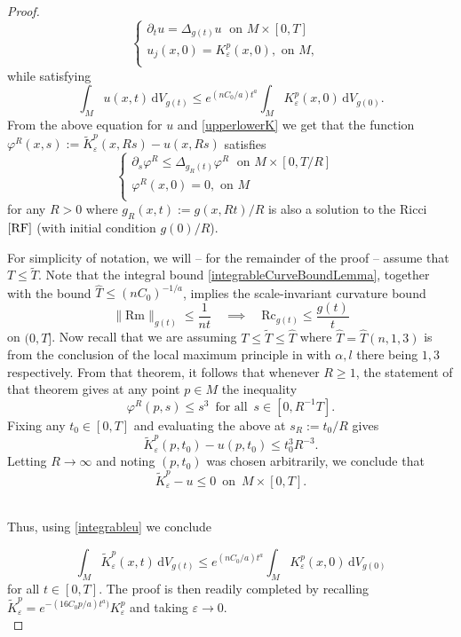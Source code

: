 \documentclass{amsart}
\theoremstyle{definition}
\newcommand{\Rm}{\mathrm{Rm}}
\newcommand{\Rc}{\mathrm{Rc}}
\newcommand{\dV}{\mathrm{d}V}
\let\epsilon\varepsilon
\begin{document}
\begin{proof}
\[
\begin{cases}
\partial_t u= \Delta_{g(t)} u\; \text{ on }M\times[0, T] & \\
u_{j}(x,0) = K_{\varepsilon}^p(x,0), \text{ on }M,& \\
\end{cases}
\]
while satisfying
\begin{equation}\label{integrableu}
\int_{M} u(x, t) \,\dV_{g(t)} \le e^{(nC_0/a)t^{a}}\int_{M} K_{\varepsilon}^p(x,0)  \,\dV_{g(0)} .
\end{equation}
From the above equation for $u$ and \eqref{upperlowerK} we get that the function $\varphi^R(x,s):=\widetilde K_{\varepsilon}^p(x,Rs)-u(x,Rs)$ satisfies
\begin{equation}\label{heatphiR}
\begin{cases}
\partial_s \varphi^R\leq \Delta_{g_R(t)} \varphi^R \; \text{ on }M\times[0, T/R] & \\
\varphi^R(x, 0)=0, \text{ on }M& \\
\end{cases}
\end{equation}
for any $R>0$ where $g_R(x, t):=g(x, Rt)/R$ is also a solution to the Ricci $\eqref{RF}$ (with initial condition $g(0)/R$).
\,

For simplicity of notation, we will – for the remainder of the proof – assume that $T\leq \widetilde T$. Note that the integral bound \eqref{integrableCurveBoundLemma}, together with the bound $\widehat T\leq (nC_0)^{-1/a}$, implies the scale-invariant curvature bound
\[
\|\Rm\|_{g(t)}\leq \frac{1}{nt} \quad \implies \quad \Rc_{g(t)}\leq \frac{g(t)}{t}
\]
on $(0,T]$.  Now recall that we are assuming $T\leq \widetilde{T}\leq \widehat T$ where $\widehat T = \widehat T(n, 1, 3)$ is from the conclusion of the local maximum principle in {\cite[Theorem 1.1]{LeeTam}} with $\alpha, l$ there being $1,3$ respectively.  From that theorem, it follows that whenever $R\geq 1$, the statement of that theorem gives at any point $p\in M$ the inequality
\[
\varphi^R(p,s)\leq s^3 \,\,\, \text{for all} \,\,\, s \in [0, R^{-1}T].
\]
Fixing any $t_0\in [0, T]$ and evaluating the above at $s_R:=t_0/R$ gives 
\[
\widetilde K_{\varepsilon}^p(p,t_0)-u(p,t_0)\leq t_0^3 R^{-3}. 
\]
Letting $R\to \infty$ and noting $(p, t_0)$ was chosen arbitrarily, we conclude that
\begin{equation}\label{upperboundu}\widetilde K_{\varepsilon}^p-u\leq 0 \,\,\, \text{on} \,\,\, M\times[0, T].
\end{equation}
\,

Thus, using \eqref{integrableu} we conclude 

\[\int_{M} \widetilde K_{\varepsilon}^p(x, t) \,\dV_{g(t)} \le e^{(nC_0/a)t^{a}}\int_{M} K_{\varepsilon}^p(x,0)  \,\dV_{g(0)} \]
for all $t\in [0, T]$. The proof is then readily completed by recalling $\widetilde K_{\varepsilon}^p = e^{-(16C_0 p/a)t^a)}K_{\varepsilon}^p$ and  taking $\epsilon\to 0$. \\
\end{proof}
\end{document}
